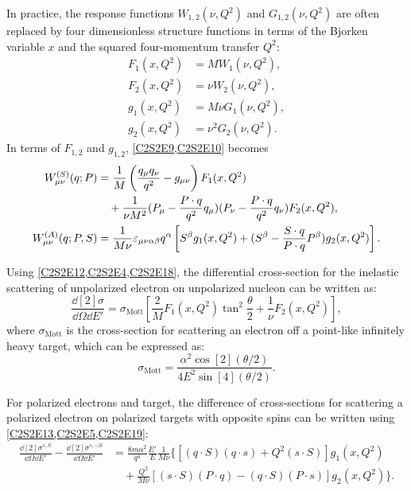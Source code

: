 In practice, the response functions $W_{1,2}(\nu,Q^2)$ and $G_{1,2}(\nu,Q^2)$ are often replaced by four dimensionless structure functions in terms of the Bjorken variable $x$ and the squared four-momentum transfer $Q^2$:
\begin{align} \label{C2S2E14}
F_1(x,Q^2) & = MW_1(\nu,Q^2), \\  \label{C2S2E15}
F_2(x,Q^2) & = \nu W_2(\nu,Q^2), \\  \label{C2S2E16}
g_1(x,Q^2) & = M \nu G_1(\nu,Q^2), \\  \label{C2S2E17}
g_2(x,Q^2) & = \nu^2G_2(\nu,Q^2).
\end{align}
In terms of $F_{1,2}$ and  $g_{1,2}$, \cref{C2S2E9,C2S2E10} becomes
\begin{align}
W_{\mu\nu}^{(S)}(q;P) & = \frac{1}{M}\left(\frac{q_\mu q_\nu}{q^2}-g_{\mu\nu}\right)F_1(x,Q^2) \notag \\ \label{C2S2E18}
& \quad +\frac{1}{\nu M^2}(P_\mu-\frac{P\cdot q}{q^2}q_\mu)(P_\nu-\frac{P\cdot q}{q^2}q_\nu)F_2(x,Q^2), \\ \label{C2S2E19}
W_{\mu\nu}^{(A)}(q;P,S) & = \frac{1}{M\nu}\varepsilon_{\mu\nu\alpha\beta}q^\alpha\left[S^\beta g_1(x,Q^2)+(S^\beta-\frac{S\cdot q}{P\cdot q}P^\beta)g_2(x,Q^2)\right].
\end{align}

Using \cref{C2S2E12,C2S2E4,C2S2E18}, the differential cross-section for the inelastic scattering of unpolarized electron on unpolarized nucleon can be written as:
\begin{equation} \label{C2S2E20}
\frac{\dd[2]{\sigma}}{\dd{\Omega}\dd{E'}} = \sigma_{\mathrm{Mott}}\left[\frac{2}{M}F_1(x,Q^2)\tan^2\frac{\theta}{2}+\frac{1}{\nu}F_2(x,Q^2)\right],
\end{equation}
where $\sigma_{\mathrm{Mott}}$ is the cross-section for scattering an electron off a point-like infinitely heavy target, which can be expressed as:
\begin{equation} \label{C2S2E21}
\sigma_{\mathrm{Mott}} = \frac{\alpha^2\cos[2](\theta/2)}{4E^2\sin[4](\theta/2)}.
\end{equation}

For polarized electrons and target, the difference of cross-sections for scattering a polarized electron on polarized targets with opposite spins can be written using \cref{C2S2E13,C2S2E5,C2S2E19}:
\begin{equation} \label{C2S2E22}
\begin{split}
\frac{\dd[2]{\sigma}^{s,S}}{\dd{\Omega}\dd{E'}}-\frac{\dd[2]{\sigma}^{s,-S}}{\dd{\Omega}\dd{E'}} & = \frac{8m\alpha^2}{q^4}\frac{E'}{E}\frac{1}{M\nu}\Big\{[(q\cdot S)(q\cdot s)+Q^2(s\cdot S)]g_1(x,Q^2) \\
& \quad +\frac{Q^2}{M\nu}[(s\cdot S)(P\cdot q)-(q\cdot S)(P\cdot s)]g_2(x,Q^2)\Big\}.
\end{split}
\end{equation}

